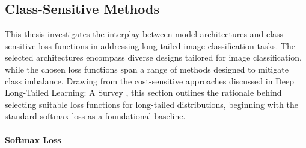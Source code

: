 \subsection{Class-Sensitive Methods}
\label{sec:loss_selection}


This thesis investigates the interplay between model architectures and class-sensitive loss functions in addressing long-tailed image classification tasks. The selected architectures encompass diverse designs tailored for image classification, while the chosen loss functions span a range of methods designed to mitigate class imbalance. Drawing from the cost-sensitive approaches discussed in Deep Long-Tailed Learning: A Survey \cite{zhang2023deep}, this section outlines the rationale behind selecting suitable loss functions for long-tailed distributions, beginning with the standard softmax loss as a foundational baseline.

\paragraph{Softmax Loss}

